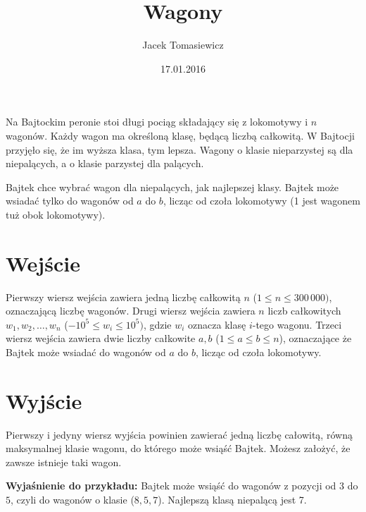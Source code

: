 \documentclass[zad,zawodnik,utf8]{sinol}
\title{Wagony}
\author{Jacek Tomasiewicz} %
\date{17.01.2016}
\begin{document}
  \begin{tasktext}%
    Na Bajtockim peronie stoi długi pociąg składający się z lokomotywy i $n$ wagonów. Każdy wagon ma określoną klasę, będącą liczbą całkowitą. W Bajtocji przyjęło się, że im wyższa klasa, tym lepsza. Wagony o klasie nieparzystej są dla niepalących, a o klasie parzystej dla palących.

Bajtek chce wybrać wagon dla niepalących, jak najlepszej klasy. Bajtek może wsiadać tylko do wagonów od $a$ do $b$, licząc od czoła lokomotywy (1 jest wagonem tuż obok lokomotywy).

    \section{Wejście}
    Pierwszy wiersz wejścia zawiera jedną liczbę całkowitą $n$ ($1 \leq  n \leq 300\,000)$, oznaczającą liczbę wagonów. Drugi wiersz wejścia zawiera $n$ liczb całkowitych $w_1, w_2, \ldots, w_n$ ($-10^5 \leq w_i \leq 10^5)$, gdzie $w_i$ oznacza klasę $i$-tego wagonu. Trzeci wiersz wejścia zawiera dwie liczby całkowite $a, b$ ($1 \leq a \leq b \leq n$), oznaczające że Bajtek może wsiadać do wagonów od $a$ do $b$, licząc od czoła lokomotywy.

    \section{Wyjście}
Pierwszy i jedyny wiersz wyjścia powinien zawierać jedną liczbę całowitą, równą maksymalnej klasie wagonu, do którego może wsiąść  Bajtek. Możesz założyć, że zawsze istnieje taki wagon.

    \makecompactexample
    
    \medskip
    \noindent
    \textbf{Wyjaśnienie do przykładu:}
    Bajtek może wsiąść do wagonów z pozycji od $3$ do $5$, czyli do wagonów o klasie ($8, 5, 7$). Najlepszą klasą niepalącą jest 7.
  \end{tasktext}
\end{document}
